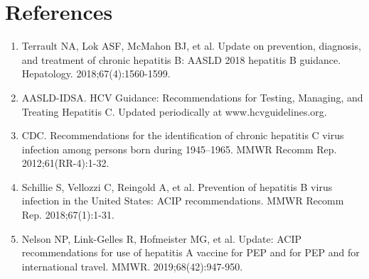 \section*{References}
\begin{enumerate}
  \item Terrault NA, Lok ASF, McMahon BJ, et al. Update on prevention, diagnosis, and treatment of chronic hepatitis B: AASLD 2018 hepatitis B guidance. Hepatology. 2018;67(4):1560-1599.
  \item AASLD-IDSA. HCV Guidance: Recommendations for Testing, Managing, and Treating Hepatitis C. Updated periodically at www.hcvguidelines.org.
  \item CDC. Recommendations for the identification of chronic hepatitis C virus infection among persons born during 1945--1965. MMWR Recomm Rep. 2012;61(RR-4):1-32.
  \item Schillie S, Vellozzi C, Reingold A, et al. Prevention of hepatitis B virus infection in the United States: ACIP recommendations. MMWR Recomm Rep. 2018;67(1):1-31.
  \item Nelson NP, Link-Gelles R, Hofmeister MG, et al. Update: ACIP recommendations for use of hepatitis A vaccine for PEP and for PEP and for international travel. MMWR. 2019;68(42):947-950.
\end{enumerate}

\clearpage
